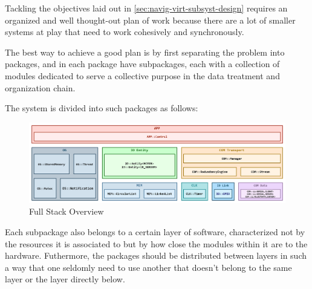 Tackling the objectives laid out in \cref{sec:navig-virt-subsyst-design} requires an organized and well thought-out plan of work because there are a lot of smaller systems at play that need to work cohesively and synchronously. 





The best way to achieve a good plan is by first separating the problem into packages, and in each package have subpackages, each with a collection of modules dedicated to serve a collective purpose in the data treatment and organization chain. 

The system is divided into such packages as follows:

\begin{figure}[H]
	\centering
	\includegraphics[width=1.0\textwidth]{./img/full-stack-overview.png}
	\caption {Full Stack Overview}
	\label{fig:full-stack-overview}
	\end{figure}
	



Each subpackage also belongs to a certain layer of software, characterized not by the resources it is associated to but by how close the modules within it are to the hardware. Futhermore, the packages should be distributed between layers in such a way that one seldomly need to use another that doesn't belong to the same layer or the layer directly below. 


